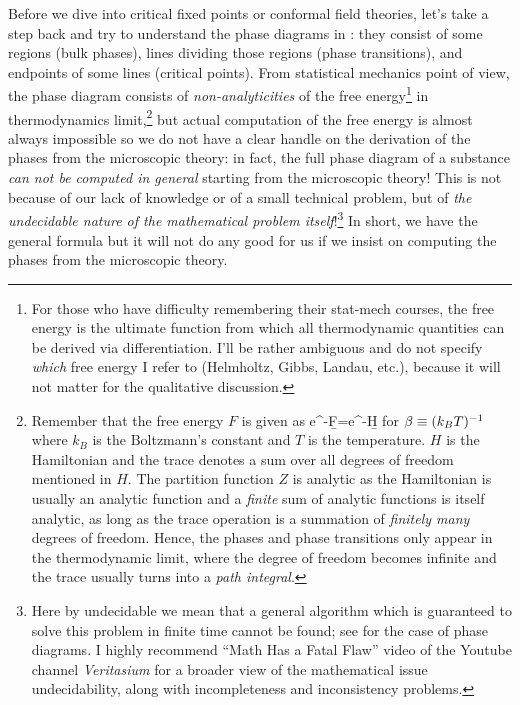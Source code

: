 Before we dive into critical fixed points or conformal field theories, let's take a step back and try to understand the phase diagrams in \figref{\ref{fig: phase diagram}}: they consist of some regions (bulk phases), lines dividing those regions (phase transitions), and endpoints of some lines (critical points).  From statistical mechanics point of view, the phase diagram consists of \emph{non-analyticities} of the free energy\footnote{For those who have difficulty remembering their stat-mech courses, the free energy is the ultimate function from which all thermodynamic quantities can be derived via differentiation. I'll be rather ambiguous and do not specify \emph{which} free energy I refer to (Helmholtz, Gibbs, Landau, etc.), because it will not matter for the qualitative discussion.} in thermodynamics limit,\footnote{Remember that the free energy $F$ is given as 
	\be 
	e^{-\b F}=\Tr e^{-\b H}
	\ee 
	for $\beta\equiv (k_B T)^{-1}$ where $k_B$ is the Boltzmann's constant and $T$ is the temperature. $H$ is the Hamiltonian and the trace denotes a sum over all degrees of freedom mentioned in $H$. The partition function $Z$ is analytic as the Hamiltonian is usually an analytic function and a \emph{finite} sum of analytic functions is itself analytic, as long as the trace operation is a summation of \emph{finitely many} degrees of freedom. Hence, the phases and phase transitions only appear in the thermodynamic limit, where the degree of freedom becomes infinite and the trace usually turns into a \emph{path integral}.
} but actual computation of the free energy is almost always impossible so we do not have a clear handle on the derivation of the phases from the microscopic theory: in fact, the full phase diagram of a substance \emph{can not be computed in general} starting from the microscopic theory! This is not because of our lack of knowledge or of a small technical problem, but  of \emph{the undecidable nature of the mathematical problem itself}!\footnote{\label{footnote: decidability}Here by undecidable we mean that a general algorithm which is guaranteed to solve this problem in finite time cannot be found; see \cite{bausch2021uncomputability} for the case of phase diagrams. I highly recommend ``Math Has a Fatal Flaw'' video of the Youtube channel \emph{Veritasium} for a broader view of the mathematical issue undecidability, along with incompleteness and inconsistency problems.
} In short, we have the general formula but it will not do any good for us if we insist on computing the phases from the microscopic theory.

